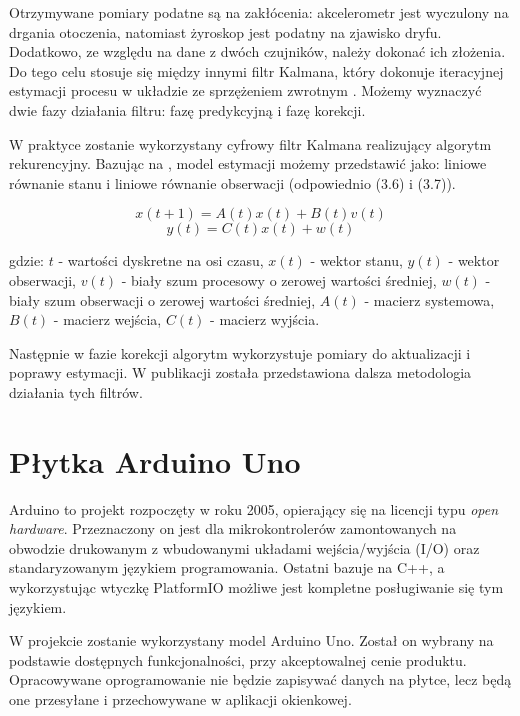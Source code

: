 Otrzymywane pomiary podatne są na zakłócenia: akcelerometr jest wyczulony na drgania otoczenia, natomiast żyroskop jest podatny na zjawisko dryfu. Dodatkowo, ze względu na dane z dwóch czujników, należy dokonać ich złożenia. Do tego celu stosuje się między innymi  filtr Kalmana, który dokonuje iteracyjnej estymacji procesu w układzie ze sprzężeniem zwrotnym \cite{filtr}. Możemy wyznaczyć dwie fazy działania filtru: fazę predykcyjną i fazę korekcji.

W praktyce zostanie wykorzystany cyfrowy filtr Kalmana realizujący algorytm rekurencyjny. Bazując na \cite{kal}, model estymacji możemy przedstawić jako: liniowe równanie stanu i liniowe równanie obserwacji (odpowiednio (3.6) i (3.7)).

\newpage

\begin{equation}
    x(t+1) = A(t)x(t) + B(t)v(t)
\end{equation}
\begin{equation}
    y(t) = C(t)x(t) + w(t)
\end{equation}

\noindent gdzie: $t$ - wartości dyskretne na osi czasu, $x(t)$ - wektor stanu, $y(t)$ - wektor obserwacji, $v(t)$ - biały szum procesowy o zerowej wartości średniej, $w(t)$ - biały szum obserwacji o zerowej wartości średniej, $A(t)$ - macierz systemowa, $B(t)$ - macierz wejścia, $C(t)$ - macierz wyjścia.

Następnie w fazie korekcji algorytm wykorzystuje pomiary do aktualizacji i poprawy estymacji. W publikacji \cite{kal} została przedstawiona dalsza metodologia działania tych filtrów.

\section{Płytka Arduino Uno}

Arduino to projekt rozpoczęty w roku 2005, opierający się na licencji typu \textit{open hardware}. Przeznaczony on jest dla mikrokontrolerów zamontowanych na obwodzie drukowanym z wbudowanymi układami wejścia/wyjścia (I/O) oraz standaryzowanym językiem programowania. Ostatni bazuje na C++, a wykorzystując wtyczkę PlatformIO możliwe jest kompletne posługiwanie się tym językiem.

W projekcie zostanie wykorzystany model Arduino Uno. Został on wybrany na podstawie dostępnych funkcjonalności, przy akceptowalnej cenie produktu. Opracowywane oprogramowanie nie będzie zapisywać danych na płytce, lecz będą one przesyłane i przechowywane w aplikacji okienkowej. 

